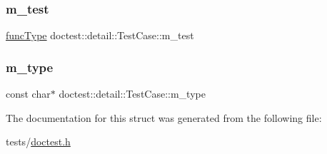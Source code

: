 \subsubsection{\texorpdfstring{m\+\_\+test}{m\_test}}
{\footnotesize\ttfamily \hyperlink{namespacedoctest_1_1detail_a7b2c60631c5f4906b26acf2e6b0e6e45}{func\+Type} doctest\+::detail\+::\+Test\+Case\+::m\+\_\+test}

\mbox{\label{structdoctest_1_1detail_1_1TestCase_ad29513e7194ebb6e53e3b1df27ebf48f}} 
\subsubsection{\texorpdfstring{m\+\_\+type}{m\_type}}
{\footnotesize\ttfamily const char$\ast$ doctest\+::detail\+::\+Test\+Case\+::m\+\_\+type}



The documentation for this struct was generated from the following file\+:\begin{DoxyCompactItemize}
\item 
tests/\hyperlink{doctest_8h}{doctest.\+h}\end{DoxyCompactItemize}
